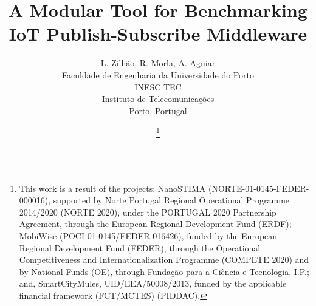 \documentclass[conference]{IEEEtran}
\begin{document}
\title{A Modular Tool for Benchmarking IoT Publish-Subscribe Middleware}

\author{
L. Zilh\~ao, R. Morla, A. Aguiar\\
Faculdade de Engenharia da Universidade do Porto\\
INESC TEC\\
Instituto de Telecomunica\c c\~oes\\
Porto, Portugal
}
\author{%
        \thanks{This work is a result of the projects: NanoSTIMA (NORTE-01-0145-FEDER-000016), supported by Norte Portugal Regional Operational Programme 2014/2020 (NORTE 2020), under the PORTUGAL 2020 Partnership Agreement, through the European Regional Development Fund (ERDF); MobiWise (POCI-01-0145/FEDER-016426), funded by the European Regional Development Fund (FEDER), through the Operational Competitiveness and Internationalization Programme (COMPETE 2020) and by National Funds (OE), through Fundação para a Ciência e Tecnologia, I.P.; and, SmartCityMules, UID/EEA/50008/2013, funded by the applicable financial framework (FCT/MCTES) (PIDDAC).}
} 

\maketitle
\end{document}
